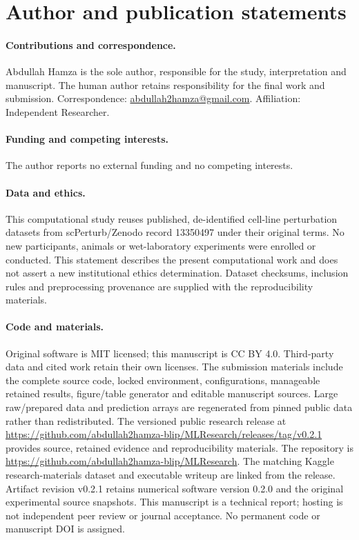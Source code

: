 \section*{Author and publication statements}
\paragraph{Contributions and correspondence.} Abdullah Hamza is the sole author, responsible for the study, interpretation and manuscript. The human author retains responsibility for the final work and submission. Correspondence: \href{mailto:abdullah2hamza@gmail.com}{abdullah2hamza@gmail.com}. Affiliation: Independent Researcher.
\paragraph{Funding and competing interests.} The author reports no external funding and no competing interests.
\paragraph{Data and ethics.} This computational study reuses published, de-identified cell-line perturbation datasets from scPerturb/Zenodo record 13350497 under their original terms. No new participants, animals or wet-laboratory experiments were enrolled or conducted. This statement describes the present computational work and does not assert a new institutional ethics determination. Dataset checksums, inclusion rules and preprocessing provenance are supplied with the reproducibility materials.
\paragraph{Code and materials.} Original software is MIT licensed; this manuscript is CC BY 4.0. Third-party data and cited work retain their own licenses. The submission materials include the complete source code, locked environment, configurations, manageable retained results, figure/table generator and editable manuscript sources. Large raw/prepared data and prediction arrays are regenerated from pinned public data rather than redistributed. The versioned public research release at \url{https://github.com/abdullah2hamza-blip/MLResearch/releases/tag/v0.2.1} provides source, retained evidence and reproducibility materials. The repository is \url{https://github.com/abdullah2hamza-blip/MLResearch}. The matching Kaggle research-materials dataset and executable writeup are linked from the release. Artifact revision v0.2.1 retains numerical software version 0.2.0 and the original experimental source snapshots. This manuscript is a technical report; hosting is not independent peer review or journal acceptance. No permanent code or manuscript DOI is assigned.
